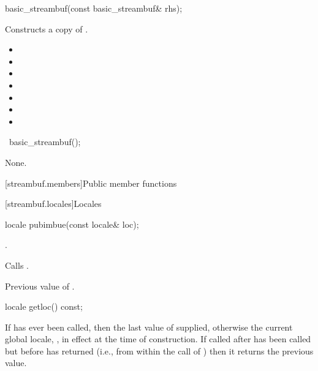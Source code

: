 %
\begin{itemdecl}
basic_streambuf(const basic_streambuf& rhs);
\end{itemdecl}

\begin{itemdescr}
\pnum
\effects Constructs a copy of .

\pnum
\ensures

\begin{itemize}
\item {}
\item {}
\item {}
\item {}
\item {}
\item {}
\item {}
\end{itemize}
\end{itemdescr}

%
\begin{itemdecl}
~basic_streambuf();
\end{itemdecl}

\begin{itemdescr}
\pnum
\effects
None.
\end{itemdescr}

[streambuf.members]{Public member functions}

[streambuf.locales]{Locales}

%
\begin{itemdecl}
locale pubimbue(const locale& loc);
\end{itemdecl}

\begin{itemdescr}
\pnum
\ensures
{}.

\pnum
\effects
Calls
.

\pnum
\returns
Previous value of
.
\end{itemdescr}

%
\begin{itemdecl}
locale getloc() const;
\end{itemdecl}

\begin{itemdescr}
\pnum
\returns
If
has ever been called, then the last value of  supplied,
otherwise the current global locale,
,
in effect at the time of construction.
If called after
has been called but before
has returned (i.e., from within the call of
)
then it returns the previous value.
\end{itemdescr}


